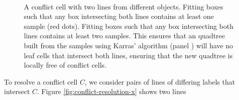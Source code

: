 \documentclass[submission]{gmp2017}
\begin{document}
\begin{figure}
  \centering
   \\
  \caption{
    \protect{} A conflict cell with two lines from different objects.
    \protect{} Fitting boxes such that any box intersecting both lines contains at least one sample (red dots).
    \protect{} Fitting boxes such that any box intersecting both lines contains at least two samples. This ensures that an quadtree built from the samples using Karras' algorithm (panel \protect{}) will have no leaf cells that intersect both lines, ensuring that the new quadtree is locally free of conflict cells.
  }
  \label{fig:conflict-resolution}
\end{figure}



To resolve a conflict cell $C$, we consider pairs of lines of differing labels that intersect $C$. Figure \ref{fig:conflict-resolution-x} shows two lines
\end{document}
